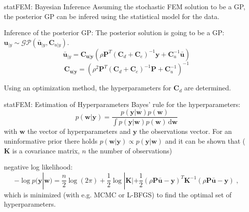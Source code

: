 \documentclass[fleqn,11pt,aspectratio=43]{beamer}
\begin{document}
\begin{frame}{statFEM: Bayesian Inference}
Assuming the stochastic FEM solution to be a GP, the posterior GP can be infered using the statistical model for the data.
\begin{block}{Inference of the posterior GP:}
The posterior solution is going to be a GP: \\
$\bm{u}_{|y} \sim \mathcal{GP}(\bar{\bm{u}}_{|y}, \bm{C}_{u|y})$.
\begin{equation*}
\bm{\bar{u}}_{|y} = \bm{C}_{\bm{u}|\bm{y}} \left(   \rho \bm{P}^T  (\bm{C}_d + \bm{C}_e)^{-1}  \bm{y}  +  \bm{C}_u^{-1}  \bar{\bm{u}}   \right)
\end{equation*}
\begin{equation*}
\bm{C}_{\bm{u}|\bm{y}} = \left(      \rho^2  \bm{P}^T   (\bm{C}_d + \bm{C}_e)^{-1}  \bm{P}  +  \bm{C}_u^{-1}    \right)^{-1} 
\end{equation*}
\end{block}
Using an optimization method, the hyperparameters for $\bm{C}_d$ are determined.

\end{frame}











\begin{frame}{statFEM: Estimation of Hyperparameters}
Bayes' rule for the hyperparameters:
\begin{equation*}
p(\bm{w}|\bm{y}) = \frac{p(\bm{y}|\bm{w}) p(\bm{w})}{\int p(\bm{y}|\bm{w}) p(\bm{w}) \, \mathrm{d}\bm{w}}
\label{eqn:bayesHyperp}
\end{equation*}
with $\bm{w}$ the vector of hyperparameters and $\bm{y}$ the observations vector.
For an uninformative prior there holds $p(\bm{w}|\bm{y}) \propto p(\bm{y}|\bm{w})$ and it can be shown that ($\bm{K}$ is a covariance matrix, $n$ the number of observations)
\begin{block}{negative log likelihood:}
\begin{equation*}
- \log p(\bm{y}|\bm{w}) = \frac{n}{2} \log(2 \pi) + \frac{1}{2} \log |\bm{K}| + \frac{1}{2}(\rho \bm{P}\bar{\bm{u}} - \bm{y})^T \bm{K}^{-1} (\rho \bm{P}\bar{\bm{u}} - \bm{y}) \;,
\label{eqn:neglog}
\end{equation*}
which is minimized (with e.g. MCMC or L-BFGS) to find the optimal set of hyperparameters.
\end{block}
 
\end{frame}
\end{document}
